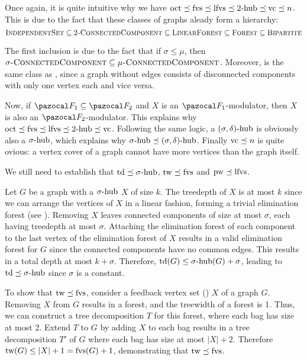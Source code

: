 Once again, it is quite intuitive why we have $\oct \lp \fvs \lp \lfvs \lp \shub[2] \lp \vc \lp n$. This is due to the fact that these classes of graphs aleady form a hierarchy:
$$\prob{IndependentSet} \subseteq \prob{$2$-ConnectedComponent} \subseteq \prob{LinearForest} \subseteq \prob{Forest} \subseteq \prob{Bipartite}$$

The first inclusion is due to the fact that if $\sigma \leq \mu$, then $\sigma\prob{-ConnectedComponent} \subseteq \mu\prob{-ConnectedComponent}$. Moreover,  is the same class as , since a graph without edges consists of disconnected components with only one vertex each and vice versa.

Now, if $\F_1 \subseteq \F_2$ and $X$ is an $\F_1$-modulator, then $X$ is also an $\F_2$-modulator. This explains why $\oct \lp \fvs \lp \lfvs \lp \shub[2] \lp \vc$. Following the same logic, a $\sdhub$ is obviously also a $\shub$, which explains why $\shub \lp \sdhub$. Finally $\vc \lp n$ is quite ovious: a vertex cover of a graph cannot have more vertices than the graph itself.

\medskip

We still need to establish that $\td \lp \shub$, $\tw \lp \fvs$ and $\pw \lp \lfvs$.

\medskip

Let $G$ be a graph with a $\shub$ $X$ of size $k$. The treedepth of $X$ is at most $k$ since we can arrange the vertices of $X$ in a linear fashion, forming a trivial elimination forest (see ). Removing $X$ leaves connected components of size at most $\sigma$, each having treedepth at most $\sigma$. Attaching the elimination forest of each component to the last vertex of the elimination forest of $X$ results in a valid elimination forest for $G$ since the connected components have no common edges. This results in a total depth at most $k + \sigma$. Therefore, $\td(G) \leq \shub(G) + \sigma$, leading to $\td \lp \shub$ since $\sigma$ is a constant.



\medskip

To show that $\tw \lp \fvs$, consider a feedback vertex set (\fvs) $X$ of a graph $G$. Removing $X$ from $G$ results in a forest, and the treewidth of a forest is 1. Thus, we can construct a tree decomposition $T$ for this forest, where each bag has size at most 2. Extend $T$ to $G$ by adding $X$ to each bag results in a tree decomposition $T'$ of $G$ where each bag has size at most $|X| + 2$. Therefore $\tw(G) \leq |X| + 1 = \fvs(G) + 1$, demonstrating that $\tw \lp \fvs$.

